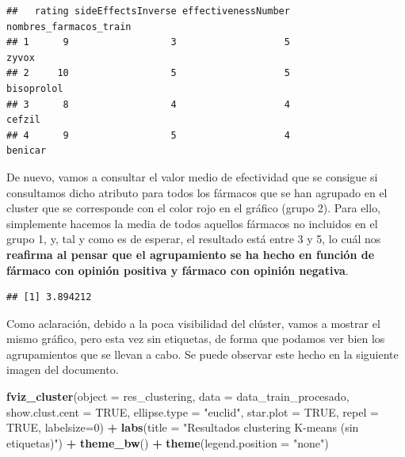 \documentclass[spanish,]{article}
\newenvironment{Shaded}{\begin{snugshade}}{\end{snugshade}}
\newcommand{\KeywordTok}[1]{\textcolor[rgb]{0.13,0.29,0.53}{\textbf{#1}}}
\newcommand{\DataTypeTok}[1]{\textcolor[rgb]{0.13,0.29,0.53}{#1}}
\newcommand{\DecValTok}[1]{\textcolor[rgb]{0.00,0.00,0.81}{#1}}
\newcommand{\StringTok}[1]{\textcolor[rgb]{0.31,0.60,0.02}{#1}}
\newcommand{\OtherTok}[1]{\textcolor[rgb]{0.56,0.35,0.01}{#1}}
\newcommand{\OperatorTok}[1]{\textcolor[rgb]{0.81,0.36,0.00}{\textbf{#1}}}
\newcommand{\NormalTok}[1]{#1}
\begin{document}
\begin{verbatim}
##   rating sideEffectsInverse effectivenessNumber nombres_farmacos_train
## 1      9                  3                   5                  zyvox
## 2     10                  5                   5             bisoprolol
## 3      8                  4                   4                 cefzil
## 4      9                  5                   4                benicar
\end{verbatim}

De nuevo, vamos a consultar el valor medio de efectividad que se
consigue si consultamos dicho atributo para todos los fármacos que se
han agrupado en el cluster que se corresponde con el color rojo en el
gráfico (grupo 2). Para ello, simplemente hacemos la media de todos
aquellos fármacos no incluidos en el grupo 1, y, tal y como es de
esperar, el resultado está entre 3 y 5, lo cuál nos \textbf{reafirma al
pensar que el agrupamiento se ha hecho en función de fármaco con opinión
positiva y fármaco con opinión negativa}.

\begin{Shaded}
\end{Shaded}

\begin{verbatim}
## [1] 3.894212
\end{verbatim}

Como aclaración, debido a la poca visibilidad del clúster, vamos a
mostrar el mismo gráfico, pero esta vez sin etiquetas, de forma que
podamos ver bien los agrupamientos que se llevan a cabo. Se puede
observar este hecho en la siguiente imagen del documento.

\begin{Shaded}
\begin{Highlighting}[]
\KeywordTok{fviz_cluster}\NormalTok{(}\DataTypeTok{object =}\NormalTok{ res_clustering, }\DataTypeTok{data =}\NormalTok{ data_train_procesado, }\DataTypeTok{show.clust.cent =} \OtherTok{TRUE}\NormalTok{,}
             \DataTypeTok{ellipse.type =} \StringTok{"euclid"}\NormalTok{, }\DataTypeTok{star.plot =} \OtherTok{TRUE}\NormalTok{, }\DataTypeTok{repel =} \OtherTok{TRUE}\NormalTok{, }\DataTypeTok{labelsize=}\DecValTok{0}\NormalTok{) }\OperatorTok{+}
\StringTok{  }\KeywordTok{labs}\NormalTok{(}\DataTypeTok{title =} \StringTok{"Resultados clustering K-means (sin etiquetas)"}\NormalTok{) }\OperatorTok{+}
\StringTok{  }\KeywordTok{theme_bw}\NormalTok{() }\OperatorTok{+}
\StringTok{  }\KeywordTok{theme}\NormalTok{(}\DataTypeTok{legend.position =} \StringTok{"none"}\NormalTok{)}
\end{Highlighting}
\end{Shaded}
\end{document}
